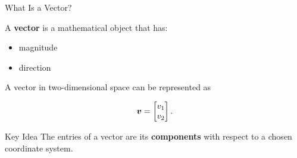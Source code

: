 \begin{frame}{What Is a Vector?}

A \textbf{vector} is a mathematical object that has:

\begin{itemize}
    \item magnitude
    \item direction
\end{itemize}

\vspace{0.3cm}

A vector in two-dimensional space can be represented as

\[
\bm{v}
=
\begin{bmatrix}
v_1\\
v_2
\end{bmatrix}.
\]

\vspace{0.3cm}

\begin{block}{Key Idea}
The entries of a vector are its \textbf{components} with respect to a chosen coordinate system.
\end{block}

\end{frame}



